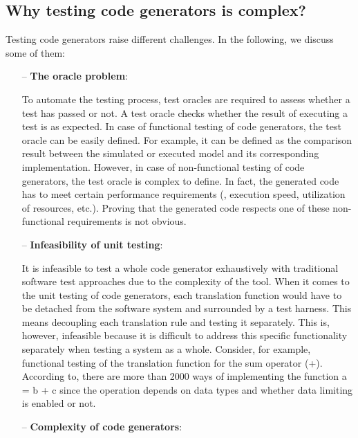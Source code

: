 \subsection{Why testing code generators is complex?}
\label{sec:Why testing code generators is complex?}
Testing code generators raise different challenges. In the following, we discuss some of them:
\begin{itemize}
	\item[--] \textbf{The oracle problem}: 
	
	To automate the testing process, test oracles are required to assess whether a test has passed or not. A test
	oracle checks whether the result of executing a test is as expected.
	In case of functional testing of code generators, the test oracle can be easily defined. For example, it can be defined as the comparison result between the simulated or executed model and its corresponding implementation. 
	However, in case of non-functional testing of code generators, the test oracle is complex to define. In fact, the generated code has to meet certain performance requirements (\eg, execution speed, utilization of resources, etc.). Proving that the generated code respects one of these non-functional requirements is not obvious. 
	
	\item[--] \textbf{Infeasibility of unit testing}:
	 
	It is infeasible to test a whole code generator exhaustively with traditional software test approaches due to the complexity of the tool. When it comes to the unit testing of code generators, each translation function would have to be detached from the software system and surrounded by a test harness. This means decoupling each translation rule and testing it separately. This is, however, infeasible because it is difficult to address this specific functionality separately when testing a system as a whole. 
	Consider, for example, functional testing of the translation function for the sum operator (+). According to\cite{burnard2004verifying}, there are more than \num{2000} ways of implementing the function a = b + c since the operation depends on data types and whether data limiting is enabled or not.
		
	\item[--] \textbf{Complexity of code generators}: 
	

\end{itemize}
